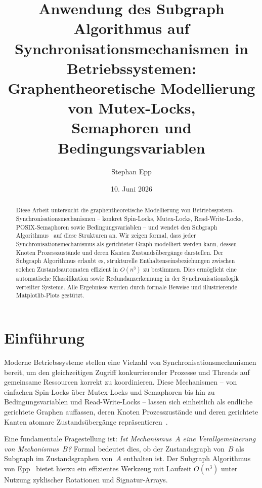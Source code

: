 ﻿\documentclass[a4paper,12pt]{article}
\title{Anwendung des Subgraph Algorithmus auf\\
Synchronisationsmechanismen in Betriebssystemen:\\
Graphentheoretische Modellierung von Mutex-Locks,\\
Semaphoren und Bedingungsvariablen}
\author{Stephan Epp}
\date{10. Juni 2026}
\theoremstyle{definition}
\begin{document}
\maketitle

\begin{abstract}
Diese Arbeit untersucht die graphentheoretische Modellierung von
Betriebssystem-Synchronisa\-tions\-me\-cha\-nis\-men -- konkret Spin-Locks,
Mutex-Locks, Read-Write-Locks, POSIX-Semaphoren sowie Bedingungsvariablen --
und wendet den Subgraph Algorithmus~\cite{epp2026subgraph} auf diese Strukturen
an. Wir zeigen formal, dass jeder Synchronisationsmechanismus als
gerichteter Graph modelliert werden kann, dessen Knoten
Prozesszustände und deren Kanten Zustandsübergänge darstellen.
Der Subgraph Algorithmus erlaubt es, strukturelle Enthaltenseins\-be\-zieh\-ungen
zwischen solchen Zustandsautomaten effizient in $O(n^{3})$ zu bestimmen.
Dies ermöglicht eine automatische Klassifikation sowie
Redundanz\-erkennung in der Synchronisationslogik verteilter Systeme.
Alle Ergebnisse werden durch formale Beweise und illustrierende
Matplotlib-Plots gestützt.
\end{abstract}

\tableofcontents
\newpage

\section{Einführung}

Moderne Betriebssysteme stellen eine Vielzahl von Synchronisations\-mechanismen
bereit, um den gleichzeitigen Zugriff konkurrierender Prozesse und Threads
auf gemeinsame Ressourcen korrekt zu koordinieren.
Diese Mechanismen -- von einfachen Spin-Locks über Mutex-Locks und Semaphoren
bis hin zu Bedingungsvariablen und Read-Write-Locks -- lassen sich
einheitlich als endliche gerichtete Graphen auffassen, deren Knoten
Prozesszustände und deren gerichtete Kanten atomare Zustandsübergänge
repräsentieren~\cite{tanenbaum2014modern,silberschatz2018os}.

Eine fundamentale Fragestellung ist: \emph{Ist Mechanismus~$A$ eine
Verallgemeinerung von Mechanismus~$B$?} Formal bedeutet dies, ob der
Zustandsgraph von~$B$ als Subgraph im Zustandsgraphen von~$A$ enthalten ist.
Der Subgraph Algorithmus von Epp~\cite{epp2026subgraph} bietet hierzu ein
effizientes Werkzeug mit Laufzeit $O(n^{3})$ unter Nutzung zyklischer
Rotationen und Signatur-Arrays.
\end{document}

